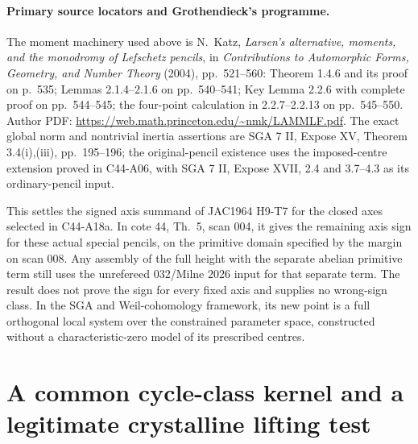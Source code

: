 \documentclass[11pt]{article}
\theoremstyle{remark}\newtheorem{remark}[theorem]{Remark}
\begin{document}
\paragraph{Primary source locators and Grothendieck's programme.}
The moment machinery used above is N.~Katz,
\emph{Larsen's alternative, moments, and the monodromy of
Lefschetz pencils}, in \emph{Contributions to Automorphic Forms,
Geometry, and Number Theory} (2004), pp.~521--560:
Theorem 1.4.6 and its proof on p.~535; Lemmas 2.1.4--2.1.6
on pp.~540--541; Key Lemma 2.2.6 with complete proof on
pp.~544--545; the four-point calculation in 2.2.7--2.2.13 on
pp.~545--550. Author PDF:
\url{https://web.math.princeton.edu/~nmk/LAMMLF.pdf}.
The exact global norm and nontrivial inertia assertions are
SGA 7 II, Expose XV, Theorem 3.4(i),(iii), pp.~195--196;
the original-pencil existence uses the imposed-centre extension
proved in C44-A06, with SGA 7 II, Expose XVII, 2.4 and
3.7--4.3 as its ordinary-pencil input.

This settles the signed axis summand of JAC1964 H9-T7 for the
closed axes selected in C44-A18a. In cote 44, Th.~5, scan 004,
it gives the remaining axis sign for these actual special
pencils, on the primitive domain specified by the margin on
scan 008. Any assembly of the full height with the separate
abelian primitive term still uses the unrefereed 032/Milne 2026
input for that separate term. The result does not prove the
sign for every fixed axis and supplies no wrong-sign class.
In the SGA and Weil-cohomology framework, its new point is a
full orthogonal local system over the constrained parameter
space, constructed without a characteristic-zero model of its
prescribed centres.


\section{A common cycle-class kernel and a legitimate crystalline lifting test}
\label{sec:c44-a18b}
\end{document}
